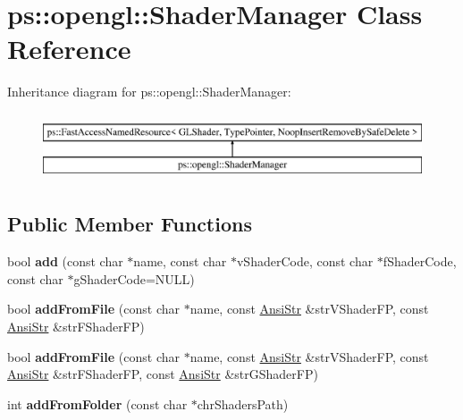 \hypertarget{classps_1_1opengl_1_1ShaderManager}{}\section{ps\+:\+:opengl\+:\+:Shader\+Manager Class Reference}
\label{classps_1_1opengl_1_1ShaderManager}
Inheritance diagram for ps\+:\+:opengl\+:\+:Shader\+Manager\+:\begin{figure}[H]
\begin{center}
\leavevmode
\includegraphics[height=2.000000cm]{classps_1_1opengl_1_1ShaderManager}
\end{center}
\end{figure}
\subsection*{Public Member Functions}
\begin{DoxyCompactItemize}
\item 
\hypertarget{classps_1_1opengl_1_1ShaderManager_a5a8abca6e977d92f965fd8e3c221be0b}{}bool {\bfseries add} (const char $\ast$name, const char $\ast$v\+Shader\+Code, const char $\ast$f\+Shader\+Code, const char $\ast$g\+Shader\+Code=N\+U\+L\+L)\label{classps_1_1opengl_1_1ShaderManager_a5a8abca6e977d92f965fd8e3c221be0b}

\item 
\hypertarget{classps_1_1opengl_1_1ShaderManager_a94645c29abc9d73b2ca3d859076cca78}{}bool {\bfseries add\+From\+File} (const char $\ast$name, const \hyperlink{classps_1_1base_1_1CAString}{Ansi\+Str} \&str\+V\+Shader\+F\+P, const \hyperlink{classps_1_1base_1_1CAString}{Ansi\+Str} \&str\+F\+Shader\+F\+P)\label{classps_1_1opengl_1_1ShaderManager_a94645c29abc9d73b2ca3d859076cca78}

\item 
\hypertarget{classps_1_1opengl_1_1ShaderManager_a2132b94083c5865219aafc1dac3b7e9c}{}bool {\bfseries add\+From\+File} (const char $\ast$name, const \hyperlink{classps_1_1base_1_1CAString}{Ansi\+Str} \&str\+V\+Shader\+F\+P, const \hyperlink{classps_1_1base_1_1CAString}{Ansi\+Str} \&str\+F\+Shader\+F\+P, const \hyperlink{classps_1_1base_1_1CAString}{Ansi\+Str} \&str\+G\+Shader\+F\+P)\label{classps_1_1opengl_1_1ShaderManager_a2132b94083c5865219aafc1dac3b7e9c}

\item 
\hypertarget{classps_1_1opengl_1_1ShaderManager_a1541525affb88e834f39d0130c2a6cee}{}int {\bfseries add\+From\+Folder} (const char $\ast$chr\+Shaders\+Path)\label{classps_1_1opengl_1_1ShaderManager_a1541525affb88e834f39d0130c2a6cee}

\end{DoxyCompactItemize}
